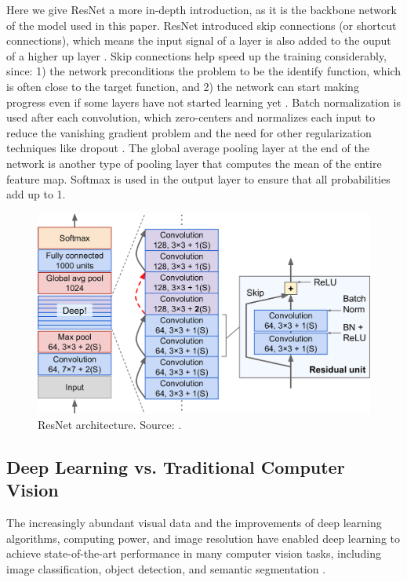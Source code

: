 \documentclass[a4paper, 11pt, oneside]{article}
\begin{document}
  Here we give ResNet a more in-depth introduction, as it is the backbone network of the model used in this paper.
  ResNet introduced skip connections (or shortcut connections), which means the input signal of a layer is also added to the
  ouput of a higher up layer \cite{geron2019hands, he2016deep}. Skip connections help speed up the training considerably,
  since: 1) the network preconditions the problem to be the identify function, which is often close to the target function,
  and 2) the network can start making progress even if some layers have not started learning yet
  \cite{geron2019hands, he2016deep}. Batch normalization \cite{ioffe2015batch} is used after each convolution, which
  zero-centers and normalizes each input to reduce the vanishing gradient problem \cite{hochreiter1998vanishing} and the
  need for other regularization techniques like dropout \cite{srivastava2014dropout}. The global average pooling layer
  at the end of the network is another type of pooling layer that computes the mean of the entire feature map. Softmax
  is used in the output layer to ensure that all probabilities add up to 1.

  \begin{figure}[ht]
    \begin{center}
      \includegraphics[width=.8\textwidth]{resnet.png}
    \end{center}
    \caption{ResNet architecture. Source: \cite{geron2019hands}.}
  \end{figure}

  \subsection{Deep Learning vs. Traditional Computer Vision}

  \label{sec:dlvscv}

  The increasingly abundant visual data and the improvements of deep learning algorithms, computing power, and image
  resolution have enabled deep learning to achieve state-of-the-art performance in many computer vision tasks, including
  image classification, object detection, and semantic segmentation \cite{qin2015underwater, voulodimos2018deep, o2019deep}.
\end{document}
